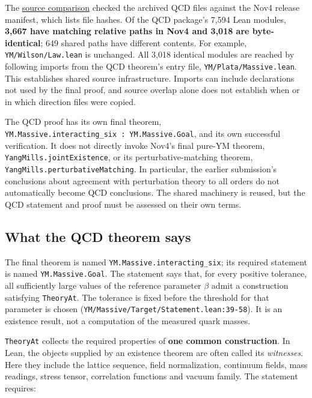 \documentclass[
  11pt,
]{article}
\begin{document}
The
\href{https://github.com/yang-mills-group/QCD/blob/main/evidence/source-relation/nov4-overlap.json}{source
comparison} checked the archived QCD files against the Nov4 release
manifest, which lists file hashes. Of the QCD package's 7,594 Lean
modules, \textbf{3,667 have matching relative paths in Nov4 and 3,018
are byte-identical}; 649 shared paths have different contents. For
example, {\small \nolinkurl{YM/Wilson/Law.lean}} is unchanged. All 3,018
identical modules are reached by following imports from the QCD
theorem's entry file, {\small \nolinkurl{YM/Plata/Massive.lean}}. This
establishes shared source infrastructure. Imports can include
declarations not used by the final proof, and source overlap alone does
not establish when or in which direction files were copied.

The QCD proof has its own final theorem,
{\small \nolinkurl{YM.Massive.interacting_six}\ \nolinkurl{:}\ \nolinkurl{YM.Massive.Goal}},
and its own successful verification. It does not directly invoke Nov4's
final pure-YM theorem, {\small \nolinkurl{YangMills.jointExistence}}, or
its perturbative-matching theorem,
{\small \nolinkurl{YangMills.perturbativeMatching}}. In particular, the
earlier submission's conclusions about agreement with perturbation
theory to all orders do not automatically become QCD conclusions. The
shared machinery is reused, but the QCD statement and proof must be
assessed on their own terms.

\subsection{What the QCD theorem says}\label{what-the-qcd-theorem-says}

The final theorem is named
{\small \nolinkurl{YM.Massive.interacting_six}}; its required statement
is named {\small \nolinkurl{YM.Massive.Goal}}. The statement says that,
for every positive tolerance, all sufficiently large values of the
reference parameter \(\beta\) admit a construction satisfying
{\small \nolinkurl{TheoryAt}}. The tolerance is fixed before the
threshold for that parameter is chosen
({\small \nolinkurl{YM/Massive/Target/Statement.lean:39-58}}). It is an
existence result, not a computation of the measured quark masses.

{\small \nolinkurl{TheoryAt}} collects the required properties of
\textbf{one common construction}. In Lean, the objects supplied by an
existence theorem are often called its \emph{witnesses}. Here they
include the lattice sequence, field normalization, continuum fields,
mass readings, stress tensor, correlation functions and vacuum family.
The statement requires:
\end{document}
